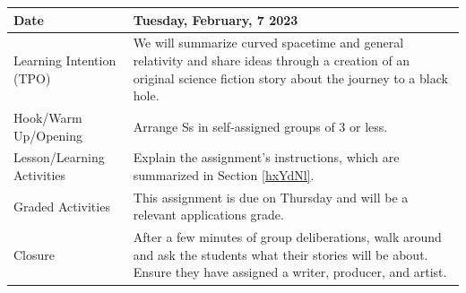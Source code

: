\documentclass{article}
\numberwithin{equation}{section}
\numberwithin{figure}{section}
\begin{document}
\begin{tabular}{|m{}|m{}|}
    \hline  
    \cellcolor{black!20}\textbf{Date} &
    \cellcolor{black!20}\textbf{Tuesday, February, 7 2023} \\
    \hline
    Learning Intention (TPO) & We will summarize curved spacetime and general relativity and share ideas through a creation of an original science fiction story about the journey to a black hole. \\
    \hline
    Hook/Warm Up/Opening & Arrange Ss in self-assigned groups of 3 or less. \\
    \hline
    Lesson/Learning Activities & Explain the assignment's instructions, which are summarized in Section \ref{hxYdNl}. \\
    \hline
    Graded Activities & This assignment is due on Thursday and will be a relevant applications grade.\\
    \hline
    Closure & After a few minutes of group deliberations, walk around and ask the students what their stories will be about. Ensure they have assigned a writer, producer, and artist.\\  
    \hline
\end{tabular}
\end{document}
